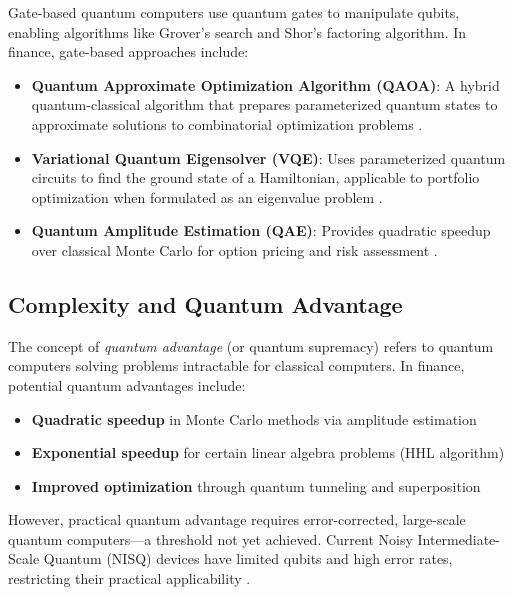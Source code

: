 \documentclass[12pt]{article}
\numberwithin{equation}{section}
\begin{document}
Gate-based quantum computers use quantum gates to manipulate qubits, enabling algorithms like Grover's search and Shor's factoring algorithm. In finance, gate-based approaches include:

\begin{itemize}[leftmargin=*]
\item \textbf{Quantum Approximate Optimization Algorithm (QAOA)}: A hybrid quantum-classical algorithm that prepares parameterized quantum states to approximate solutions to combinatorial optimization problems \citep{Farhi2014QAOA}.

\item \textbf{Variational Quantum Eigensolver (VQE)}: Uses parameterized quantum circuits to find the ground state of a Hamiltonian, applicable to portfolio optimization when formulated as an eigenvalue problem \citep{Peruzzo2014VQE}.

\item \textbf{Quantum Amplitude Estimation (QAE)}: Provides quadratic speedup over classical Monte Carlo for option pricing and risk assessment \citep{Brassard2002QAE, Rebentrost2018QuantumFinance}.
\end{itemize}

\subsection{Complexity and Quantum Advantage}

The concept of \textit{quantum advantage} (or quantum supremacy) refers to quantum computers solving problems intractable for classical computers. In finance, potential quantum advantages include:

\begin{itemize}[leftmargin=*]
\item \textbf{Quadratic speedup} in Monte Carlo methods via amplitude estimation
\item \textbf{Exponential speedup} for certain linear algebra problems (HHL algorithm) \citep{Harrow2009HHL}
\item \textbf{Improved optimization} through quantum tunneling and superposition
\end{itemize}

However, practical quantum advantage requires error-corrected, large-scale quantum computers—a threshold not yet achieved. Current Noisy Intermediate-Scale Quantum (NISQ) devices have limited qubits and high error rates, restricting their practical applicability \citep{Preskill2018NISQ}.
\end{document}

